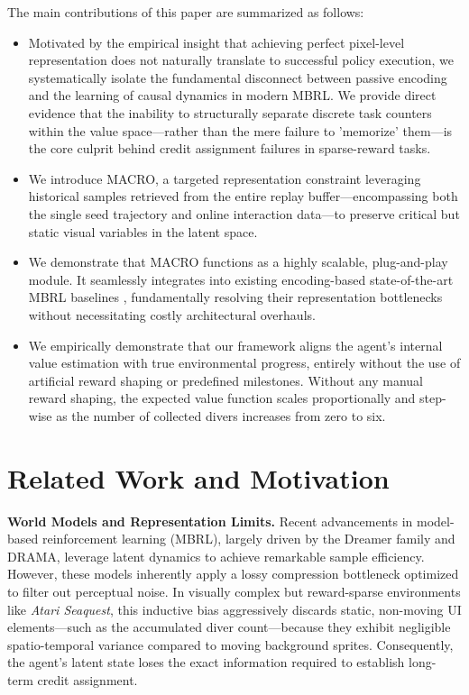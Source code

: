 \documentclass{article} %
\begin{document}
The main contributions of this paper are summarized as follows:
\begin{itemize}
    \item Motivated by the empirical insight that achieving perfect pixel-level representation does not naturally translate to successful policy execution, we systematically isolate the fundamental disconnect between passive encoding and the learning of causal dynamics in modern MBRL. We provide direct evidence that the inability to structurally separate discrete task counters within the value space---rather than the mere failure to 'memorize' them---is the core culprit behind credit assignment failures in sparse-reward tasks.
    \item We introduce MACRO, a targeted representation constraint leveraging historical samples retrieved from the entire replay buffer---encompassing both the single seed trajectory and online interaction data---to preserve critical but static visual variables in the latent space.
    \item We demonstrate that MACRO functions as a highly scalable, plug-and-play module. It seamlessly integrates into existing encoding-based state-of-the-art MBRL baselines \citep[e.g., DreamerV3, STORM, DRAMA;][]{hafner2025mastering, zhang2023storm, wang2025drama}, fundamentally resolving their representation bottlenecks without necessitating costly architectural overhauls.
    \item We empirically demonstrate that our framework aligns the agent's internal value estimation with true environmental progress, entirely without the use of artificial reward shaping or predefined milestones. Without any manual reward shaping, the expected value function scales proportionally and step-wise as the number of collected divers increases from zero to six.
\end{itemize}

\section{Related Work and Motivation}

\textbf{World Models and Representation Limits.}
Recent advancements in model-based reinforcement learning (MBRL), largely driven by the Dreamer family \citep{hafner2025mastering} and DRAMA, leverage latent dynamics to achieve remarkable sample efficiency. However, these models inherently apply a lossy compression bottleneck optimized to filter out perceptual noise. In visually complex but reward-sparse environments like \textit{Atari Seaquest}, this inductive bias aggressively discards static, non-moving UI elements—such as the accumulated diver count—because they exhibit negligible spatio-temporal variance compared to moving background sprites. Consequently, the agent's latent state loses the exact information required to establish long-term credit assignment.
\end{document}
